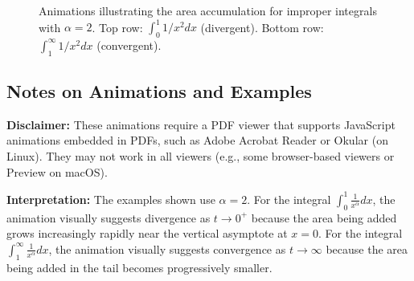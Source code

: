 \begin{figure}[htbp]
\begin{minipage}{0.40\textwidth}
		\begin{animateinline}[controls,autoplay,loop]{10}
		\end{animateinline}
	\end{minipage}

	\caption{Animations illustrating the area accumulation for improper integrals with $\alpha=2$. Top row: $\int_0^1 1/x^2 dx$ (divergent). Bottom row: $\int_1^\infty 1/x^2 dx$ (convergent).}
	\label{fig:improper_integral_animations}
\end{figure}

\subsection*{Notes on Animations and Examples}

\textbf{Disclaimer:} These animations require a PDF viewer that supports JavaScript animations embedded in PDFs, such as Adobe Acrobat Reader or Okular (on Linux). They may not work in all viewers (e.g., some browser-based viewers or Preview on macOS).

\textbf{Interpretation:} The examples shown use $\alpha=2$. For the integral $\int_0^1 \frac{1}{x^\alpha} dx$, the animation visually suggests divergence as $t \to 0^+$ because the area being added grows increasingly rapidly near the vertical asymptote at $x=0$. For the integral $\int_1^\infty \frac{1}{x^\alpha} dx$, the animation visually suggests convergence as $t \to \infty$ because the area being added in the tail becomes progressively smaller.

